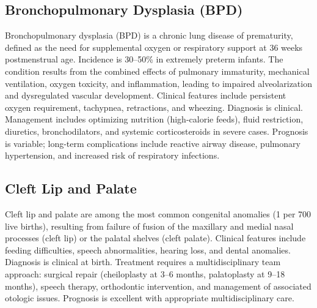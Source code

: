 \subsection{Bronchopulmonary Dysplasia (BPD)}
\label{sec:Bronchopulmonary Dysplasia}
Bronchopulmonary dysplasia (BPD) is a chronic lung disease of prematurity, defined as the need for supplemental oxygen or respiratory support at 36 weeks postmenstrual age. Incidence is 30--50\% in extremely preterm infants. The condition results from the combined effects of pulmonary immaturity, mechanical ventilation, oxygen toxicity, and inflammation, leading to impaired alveolarization and dysregulated vascular development. Clinical features include persistent oxygen requirement, tachypnea, retractions, and wheezing. Diagnosis is clinical. Management includes optimizing nutrition (high-calorie feeds), fluid restriction, diuretics, bronchodilators, and systemic corticosteroids in severe cases. Prognosis is variable; long-term complications include reactive airway disease, pulmonary hypertension, and increased risk of respiratory infections.

\subsection{Cleft Lip and Palate}
\label{sec:Cleft Lip and Palate}
Cleft lip and palate are among the most common congenital anomalies (1 per 700 live births), resulting from failure of fusion of the maxillary and medial nasal processes (cleft lip) or the palatal shelves (cleft palate). Clinical features include feeding difficulties, speech abnormalities, hearing loss, and dental anomalies. Diagnosis is clinical at birth. Treatment requires a multidisciplinary team approach: surgical repair (cheiloplasty at 3--6 months, palatoplasty at 9--18 months), speech therapy, orthodontic intervention, and management of associated otologic issues. Prognosis is excellent with appropriate multidisciplinary care.

